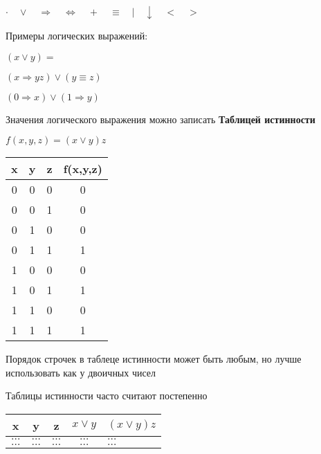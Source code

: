 \documentclass[russian]{lecture-notes}
\begin{document}
\begin{sloppypar}
\begin{definition}
	$\cdot \quad \lor \quad \Rightarrow \quad  \Leftrightarrow \quad + \quad \equiv \quad | \quad \downarrow \quad < \quad >$ 
\end{definition}

\begin{example} 
	Примеры логических выражений:

	$(x \lor y) = $
	
	$(x \Rightarrow yz) \lor (y \equiv z)$
	
	$(0 \Rightarrow x) \lor (1 \Rightarrow y)$
\end{example}

\begin{definition} 
	Значения логического выражения можно записать \textbf{Таблицей истинности}
\end{definition}

\begin{example}
	$f(x, y, z) = (x \lor y)z$
	
	\begin{table}[h!]
		\centering
		\begin{tabular}{|c|c|c|c|}
			\hline
			x & y & z & f(x,y,z) \\ \hline
			0 & 0 & 0 & 0        \\ \hline
			0 & 0 & 1 & 0        \\ \hline
			0 & 1 & 0 & 0        \\ \hline
			0 & 1 & 1 & 1        \\ \hline
			1 & 0 & 0 & 0        \\ \hline
			1 & 0 & 1 & 1        \\ \hline
			1 & 1 & 0 & 0        \\ \hline
			1 & 1 & 1 & 1        \\ \hline
		\end{tabular}
	\end{table}
\end{example}

\begin{remark}
	Порядок строчек в таблеце истинности может быть любым, но лучше использовать как у двоичных чисел    
\end{remark}

\begin{proposition}
    Таблицы истинности часто считают постепенно
	
	\begin{table}[h!]
		\centering		
		\begin{tabular}{|c|c|c|c|l|}
			\hline
			x & y & z & $x \lor y$ & $(x \lor y)z$  \\ \hline
			$\dots$ & $\dots$ & $\dots$ & $\dots$ & $\dots$ \\ \hline
			$\dots$ & $\dots$ & $\dots$ & $\dots$ & $\dots$ \\ \hline
		\end{tabular}
	\end{table}
\end{proposition}


\end{sloppypar}
\end{document}

